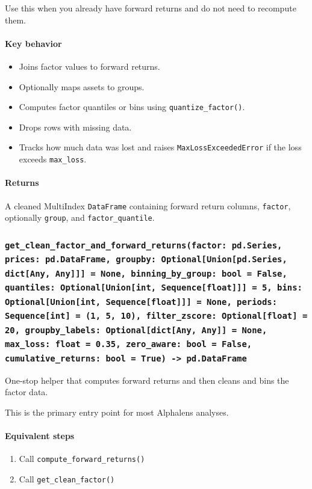 \documentclass[11pt]{article}
\begin{document}
Use this when you already have forward returns and do not need to recompute them.

\paragraph{Key behavior}
\begin{itemize}
  \item Joins factor values to forward returns.
  \item Optionally maps assets to groups.
  \item Computes factor quantiles or bins using \texttt{quantize\_factor()}.
  \item Drops rows with missing data.
  \item Tracks how much data was lost and raises \texttt{MaxLossExceededError} if the loss exceeds \texttt{max\_loss}.
\end{itemize}

\paragraph{Returns}
A cleaned MultiIndex \texttt{DataFrame} containing forward return columns, \texttt{factor}, optionally \texttt{group}, and \texttt{factor\_quantile}.

\subsubsection{\texttt{get\_clean\_factor\_and\_forward\_returns(factor: pd.Series, prices: pd.DataFrame, groupby: Optional[Union[pd.Series, dict[Any, Any]]] = None, binning\_by\_group: bool = False, quantiles: Optional[Union[int, Sequence[float]]] = 5, bins: Optional[Union[int, Sequence[float]]] = None, periods: Sequence[int] = (1, 5, 10), filter\_zscore: Optional[float] = 20, groupby\_labels: Optional[dict[Any, Any]] = None, max\_loss: float = 0.35, zero\_aware: bool = False, cumulative\_returns: bool = True) -> pd.DataFrame}}
One-stop helper that computes forward returns and then cleans and bins the factor data.

This is the primary entry point for most Alphalens analyses.

\paragraph{Equivalent steps}
\begin{enumerate}
  \item Call \texttt{compute\_forward\_returns()}
  \item Call \texttt{get\_clean\_factor()}
\end{enumerate}
\end{document}
